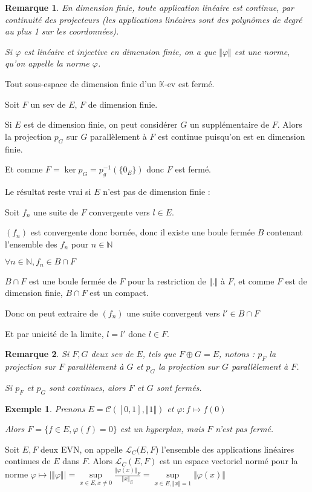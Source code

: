 \documentclass[a4paper,12pt]{book}
\newcommand{\Prop}[2]{\begin{tcolorbox}[sharp corners, colback=white,colframe=red!90!black!75, title=Proposition : #1]#2\end{tcolorbox}}
\newcommand{\Pre}[1]{\begin{tcolorbox}[sharp corners, colback=white,colframe=green!60!green!30!black!75, title=Preuve]#1\end{tcolorbox}}
\newtheorem{Exe}{Exemple}[section]
\newtheorem{Rem}{Remarque}[section]
\def\N{\mathbb{N}}
\def\K{\mathbb{K}}
\begin{document}
\begin{Rem}
En dimension finie, toute application linéaire est continue, par continuité des projecteurs (les applications linéaires sont des polynômes de degré au plus 1 sur les coordonnées).
\par Si $\varphi$ est linéaire et injective en dimension finie, on a que $\Vert\varphi\Vert$ est une norme, qu'on appelle la norme $\varphi$.
\end{Rem}
\Prop{Fermeture des sev}{Tout sous-espace de dimension finie d'un $\K$-ev est fermé.}
\Pre{Soit $F$ un sev de $E$, $F$ de dimension finie. \par Si $E$ est de dimension finie, on peut considérer $G$ un supplémentaire de $F$. Alors la projection $p_G$ sur $G$ parallèlement à $F$ est continue puisqu'on est en dimension finie. \par Et comme $F=\ker p_G = p_g^{-1}(\{0_E\})$ donc $F$ est fermé.
\par Le résultat reste vrai si $E$ n'est pas de dimension finie : \par Soit $f_n$ une suite de $F$ convergente vers $l\in E$. \par $(f_n)$ est convergente donc bornée, donc il existe une boule fermée $B$ contenant l'ensemble des $f_n$ pour $n\in\N$ \par $\forall n\in\N, f_n\in B\cap F$ \par $B\cap F$ est une boule fermée de $F$ pour la restriction de $\Vert.\Vert$ à $F$, et comme $F$ est de dimension finie, $B\cap F$ est un compact. \par Donc on peut extraire de $(f_n)$ une suite convergent vers $l'\in B\cap F$ \par Et par unicité de la limite, $l=l'$ donc $l\in F$.}
\begin{Rem}
Si $F,G$ deux sev de $E$, tels que $F\oplus G=E$, notons : $p_F$ la projection sur $F$ parallèlement à $G$ et $p_G$ la projection sur $G$ parallèlement à $F$. \par Si $p_F$ et $p_G$ sont continues, alors $F$ et $G$ sont fermés.
\end{Rem}
\begin{Exe}
Prenons $E=\mathcal{C}([0,1],\Vert 1\Vert)$ et $\varphi : f\mapsto f(0)$ \par Alors $F =\{f\in E,\varphi(f)=0\}$ est un hyperplan, mais $F$ n'est pas fermé.
\end{Exe}
\Prop{Norme triple}{Soit $E,F$ deux EVN, on appelle $\mathcal{L}_C(E,F$) l'ensemble des applications linéaires continues de $E$ dans $F$. Alors $\mathcal{L}_C(E,F)$ est un espace vectoriel normé pour la norme $\varphi\mapsto \vert\Vert\varphi\Vert\vert=\sup\limits_{x\in E, x\neq 0} \frac{\Vert \varphi(x)\Vert_F}{\Vert x\Vert_E} = \sup\limits_{x\in E, \Vert x\Vert=1}\Vert \varphi(x)\Vert$}
\end{document}

